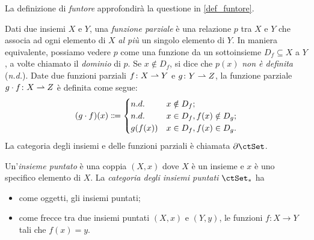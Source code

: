La definizione di \emph{funtore} approfondirà la questione in \ref{def_funtore}.
\begin{example}\label{ex_cat_pfun}
 Dati due insiemi \(X\) e \(Y\), una \emph{funzione parziale} è una relazione \(p\) tra \(X\) e \(Y\) che associa ad ogni elemento di \(X\) \emph{al più} un singolo elemento di \(Y\). In maniera equivalente, possiamo vedere \(p\) come una funzione da un sottoinsieme \(D_f\subseteq X\) a \(Y\), a volte chiamato il \emph{dominio} di \(p\). Se \(x\notin D_f\), si dice che \(p(x)\) \emph{non è definita} (\emph{n.d.}).
 Date due funzioni parziali \(f\colon X\rightharpoonup Y\) e \(g\colon Y\rightharpoonup Z\), la funzione parziale \(g\cdot f\colon X\rightharpoonup Z\) è definita come segue:
 \[
  (g\cmp f) (x) \defeq \begin{cases}
   n.d.    & x\notin D_f ;              \\
   n.d.    & x\in D_f, f(x)\notin D_g ; \\
   g(f(x)) & x\in D_f, f(x)\in D_g .
  \end{cases}
 \]
 La categoria degli insiemi e delle funzioni parziali è chiamata \(\pSet\).
\end{example}
\begin{example}\label{ex_cat_puntati}
 Un'\emph{insieme puntato} è una coppia \((X,x)\) dove \(X\) è un insieme e \(x\) è uno specifico elemento di \(X\).
 La \emph{categoria degli insiemi puntati} \(\ctSet_*\) ha
 \begin{itemize}
  \item come oggetti, gli insiemi puntati;
  \item come frecce tra due insiemi puntati \((X,x)\) e \((Y,y)\), le funzioni \(f\colon X\to Y\) tali che \(f(x)=y\).
 \end{itemize}
\end{example}
